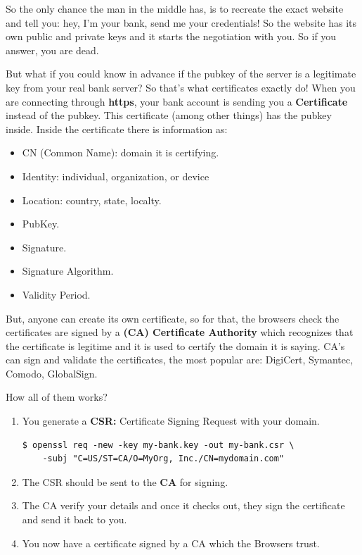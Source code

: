 \documentclass{article}
\newenvironment{codetemplate}[1][]{%
  \mybasecolorbox[#1]
  \itshape
}{%
  \endmybasecolorbox
}
\begin{document}
So the only chance the man in the middle has, is to recreate the exact website and tell you: hey, I'm your bank, send me your credentials! So the website has its own public and private keys and it starts the negotiation with you. So if you answer, you are dead.

But what if you could know in advance if the pubkey of the server is a legitimate key from your real bank server?
So that's what certificates exactly do! When you are connecting through \textbf{https}, your bank account is sending you a \textbf{Certificate} instead of the pubkey.
This certificate (among other things) has the pubkey inside. Inside the certificate there is information as:
\begin{itemize}
    \item CN (Common Name): domain it is certifying.
    \item Identity: individual, organization, or device
    \item Location: country, state, localty.
    \item PubKey.
    \item Signature.
    \item Signature Algorithm.
    \item Validity Period.
\end{itemize}

But, anyone can create its own certificate, so for that, the browsers check the certificates are signed by a \textbf{(CA) Certificate Authority} which recognizes that 
the certificate is legitime and it is used to certify the domain it is saying. CA's can sign and validate the certificates, the most popular are: DigiCert, Symantec, Comodo, GlobalSign.

How all of them works?

\begin{enumerate}
    \item You generate a \textbf{CSR:} Certificate Signing Request with your domain.
\begin{codetemplate}{}
\begin{verbatim}
$ openssl req -new -key my-bank.key -out my-bank.csr \
    -subj "C=US/ST=CA/O=MyOrg, Inc./CN=mydomain.com"
\end{verbatim}
\end{codetemplate}
    \item The CSR should be sent to the \textbf{CA} for signing.
    \item The CA verify your details and once it checks out, they sign the certificate and send it back to you.
    \item You now have a certificate signed by a CA which the Browsers trust.
\end{enumerate}
\end{document}
